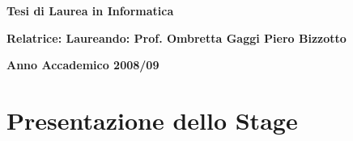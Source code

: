 \begin{titlepage}
\begin{center}
	\textbf{Tesi di Laurea in Informatica}
\end{center}

\vspace{30pt}

\begin{center}
\textbf{Relatrice:   \hspace{230pt}  Laureando:   \linebreak 
Prof. Ombretta Gaggi \hspace{144pt} Piero Bizzotto}
\end{center}

\vspace{30pt}

\begin{center}
\textbf{Anno Accademico 2008/09}
\end{center}

\end{titlepage}
\newpage

\clearpage
\null
\thispagestyle{empty}
\clearpage
\frontmatter



\tableofcontents
\listoffigures
\clearpage{\pagestyle{empty}\cleardoublepage}


\mainmatter

\chapter{Presentazione dello Stage}
